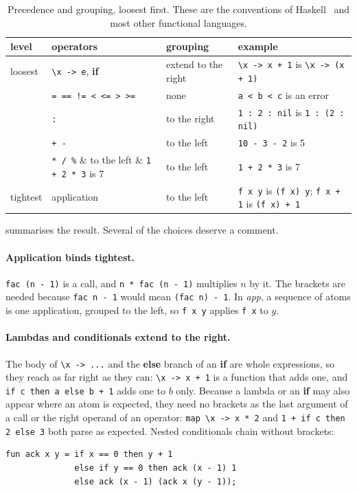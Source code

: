 \documentclass[11pt,a4paper]{article}
\theoremstyle{definition}
\theoremstyle{plain}
\newcommand{\kw}[1]{\textbf{#1}}
\newcommand{\nt}[1]{\textit{#1}}
\begin{document}
\begin{table}[t]
\centering
\small
\begin{tabular}{@{}l l l l@{}}
\toprule
level & operators & grouping & example\\
\midrule
loosest & \verb|\x -> e|, \kw{if} & extend to the right & \verb|\x -> x + 1| is \verb|\x -> (x + 1)|\\
 & \verb|= == != < <= > >=| & none & \verb|a < b < c| is an error\\
 & \verb|:| & to the right & \verb|1 : 2 : nil| is \verb|1 : (2 : nil)|\\
 & \verb|+ -| & to the left & \verb|10 - 3 - 2| is 5\\
 & \verb|* / %| & to the left & \verb|1 + 2 * 3| is 7\\
tightest & application & to the left & \verb|f x y| is \verb|(f x) y|; \verb|f x + 1| is \verb|(f x) + 1|\\
\bottomrule
\end{tabular}
\caption{Precedence and grouping, loosest first. These are the conventions of
Haskell~\cite{haskell2010} and most other functional languages.}
\label{tab:precedence}
\end{table}

 summarises the result. Several of the choices deserve a
comment.

\paragraph{Application binds tightest.} \verb|fac (n - 1)| is a call, and
\verb|n * fac (n - 1)| multiplies $n$ by it. The brackets are needed because
\verb|fac n - 1| would mean \verb|(fac n) - 1|. In \nt{app}, a sequence of
atoms is one application, grouped to the left, so \verb|f x y| applies
\verb|f x| to $y$.

\paragraph{Lambdas and conditionals extend to the right.} The body of
\verb|\x -> ...| and the \kw{else} branch of an \kw{if} are whole expressions,
so they reach as far right as they can: \verb|\x -> x + 1| is a function that
adds one, and \verb|if c then a else b + 1| adds one to $b$ only. Because a
lambda or an \kw{if} may also appear where an atom is expected, they need no
brackets as the last argument of a call or the right operand of an operator:
\verb|map \x -> x * 2| and \verb|1 + if c then 2 else 3| both parse as
expected. Nested conditionals chain without brackets:
\begin{lstlisting}[style=morc]
fun ack x y = if x == 0 then y + 1
              else if y == 0 then ack (x - 1) 1
              else ack (x - 1) (ack x (y - 1));
\end{lstlisting}
\end{document}
